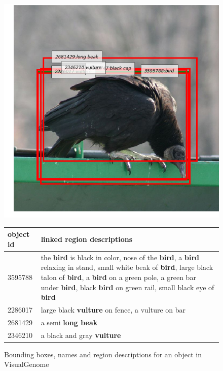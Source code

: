 \begin{figure}
\begin{center}
\includegraphics[scale=0.32]{figures/vulture.png} 
\begin{tabular}{lp{6cm}}
object id & linked region descriptions\\
\hline
3595788 & the \textbf{bird} is black in color, nose of the \textbf{bird}, a \textbf{bird} relaxing in stand, small white beak of \textbf{bird}, large black talon of \textbf{bird}, a \textbf{bird} on a green pole, a green bar under \textbf{bird}, black \textbf{bird} on green rail, small black eye of \textbf{bird}\\
2286017 & large black \textbf{vulture} on fence, a vulture on bar\\
2681429 & a semi \textbf{long beak}\\  
2346210 & a black and gray \textbf{vulture}\\
 \end{tabular}
\caption{Bounding boxes, names and region descriptions for an object in VisualGenome}
\label{fig:bird}
\end{center}
\end{figure}

